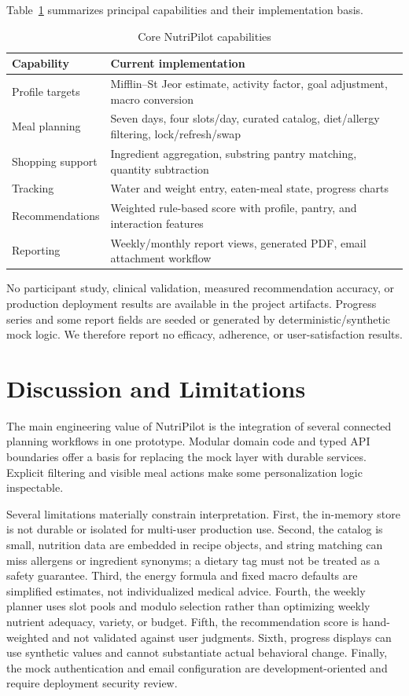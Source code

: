 \documentclass[10pt,twocolumn]{article}
\begin{document}
Table~\ref{tab:features} summarizes principal capabilities and their implementation basis.
\begin{table}[t]
\centering\small
\caption{Core NutriPilot capabilities}
\label{tab:features}
\begin{tabular}{p{}p{}}
\toprule
Capability & Current implementation \\
\midrule
Profile targets & Mifflin--St Jeor estimate, activity factor, goal adjustment, macro conversion \\
Meal planning & Seven days, four slots/day, curated catalog, diet/allergy filtering, lock/refresh/swap \\
Shopping support & Ingredient aggregation, substring pantry matching, quantity subtraction \\
Tracking & Water and weight entry, eaten-meal state, progress charts \\
Recommendations & Weighted rule-based score with profile, pantry, and interaction features \\
Reporting & Weekly/monthly report views, generated PDF, email attachment workflow \\
\bottomrule
\end{tabular}
\end{table}

No participant study, clinical validation, measured recommendation accuracy, or production deployment results are available in the project artifacts. Progress series and some report fields are seeded or generated by deterministic/synthetic mock logic. We therefore report no efficacy, adherence, or user-satisfaction results.

\section{Discussion and Limitations}
The main engineering value of NutriPilot is the integration of several connected planning workflows in one prototype. Modular domain code and typed API boundaries offer a basis for replacing the mock layer with durable services. Explicit filtering and visible meal actions make some personalization logic inspectable.

Several limitations materially constrain interpretation. First, the in-memory store is not durable or isolated for multi-user production use. Second, the catalog is small, nutrition data are embedded in recipe objects, and string matching can miss allergens or ingredient synonyms; a dietary tag must not be treated as a safety guarantee. Third, the energy formula and fixed macro defaults are simplified estimates, not individualized medical advice. Fourth, the weekly planner uses slot pools and modulo selection rather than optimizing weekly nutrient adequacy, variety, or budget. Fifth, the recommendation score is hand-weighted and not validated against user judgments. Sixth, progress displays can use synthetic values and cannot substantiate actual behavioral change. Finally, the mock authentication and email configuration are development-oriented and require deployment security review.
\end{document}
